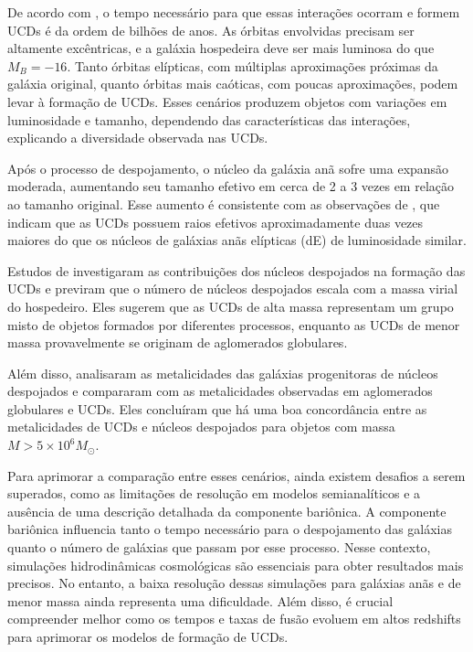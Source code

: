 De acordo com \cite{Bekki_2003}, o tempo necessário para que essas interações ocorram e formem UCDs é da ordem de bilhões de anos. As órbitas envolvidas precisam ser altamente excêntricas, e a galáxia hospedeira deve ser mais luminosa do que $M_B = -16$. Tanto órbitas elípticas, com múltiplas aproximações próximas da galáxia original, quanto órbitas mais caóticas, com poucas aproximações, podem levar à formação de UCDs. Esses cenários produzem objetos com variações em luminosidade e tamanho, dependendo das características das interações, explicando a diversidade observada nas UCDs.

Após o processo de despojamento, o núcleo da galáxia anã sofre uma expansão moderada, aumentando seu tamanho efetivo em cerca de 2 a 3 vezes em relação ao tamanho original. Esse aumento é consistente com as observações de \cite{Evstigneeva_2008}, que indicam que as UCDs possuem raios efetivos aproximadamente duas vezes maiores do que os núcleos de galáxias anãs elípticas (dE) de luminosidade similar.

Estudos de \cite{Pfeffer_2016} investigaram as contribuições dos núcleos despojados na formação das UCDs e previram que o número de núcleos despojados escala com a massa virial do hospedeiro. Eles sugerem que as UCDs de alta massa representam um grupo misto de objetos formados por diferentes processos, enquanto as UCDs de menor massa provavelmente se originam de aglomerados globulares.

Além disso, \cite{Pfeffer_2016} analisaram as metalicidades das galáxias progenitoras de núcleos despojados e compararam com as metalicidades observadas em aglomerados globulares e UCDs. Eles concluíram que há uma boa concordância entre as metalicidades de UCDs e núcleos despojados para objetos com massa $M > 5 \times 10^6 M_{\odot}$.

Para aprimorar a comparação entre esses cenários, ainda existem desafios a serem superados, como as limitações de resolução em modelos semianalíticos e a ausência de uma descrição detalhada da componente bariônica. A componente bariônica influencia tanto o tempo necessário para o despojamento das galáxias quanto o número de galáxias que passam por esse processo. Nesse contexto, simulações hidrodinâmicas cosmológicas são essenciais para obter resultados mais precisos. No entanto, a baixa resolução dessas simulações para galáxias anãs e de menor massa ainda representa uma dificuldade. Além disso, é crucial compreender melhor como os tempos e taxas de fusão evoluem em altos redshifts para aprimorar os modelos de formação de UCDs.

